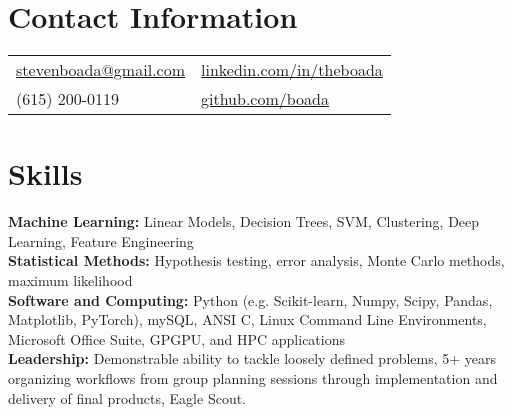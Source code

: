 \documentclass[margin,line, 11pt]{res}
\begin{document}

\begin{resume}
\vspace*{-2mm}
\section{Contact Information}
\begin{tabular}{@{}p{4.45in}p{4in}}
\href{mailto:stevenboada@gmail.com}{stevenboada@gmail.com} & \href{https://linkedin.com/in/theboada}{linkedin.com/in/theboada} \\
(615) 200-0119 & \href{https://github.com/boada}{github.com/boada} \\
\end{tabular}
\vspace*{-4mm}


\section{Skills}
\textbf{Machine Learning:} Linear Models, Decision Trees, SVM, Clustering, Deep Learning, Feature Engineering\\
\textbf{Statistical Methods:} Hypothesis testing, error analysis, Monte Carlo methods, maximum likelihood\\
\textbf{Software and Computing:}  Python (e.g. Scikit-learn, Numpy, Scipy, Pandas, Matplotlib, PyTorch), mySQL, ANSI C, Linux Command Line Environments, Microsoft Office Suite, GPGPU, and HPC applications\\
\textbf{Leadership:} Demonstrable ability to tackle loosely defined problems, 5+ years organizing workflows from group planning sessions through implementation and delivery of final products, Eagle Scout. \\
\vspace*{-7mm}


\end{resume}
\end{document}
